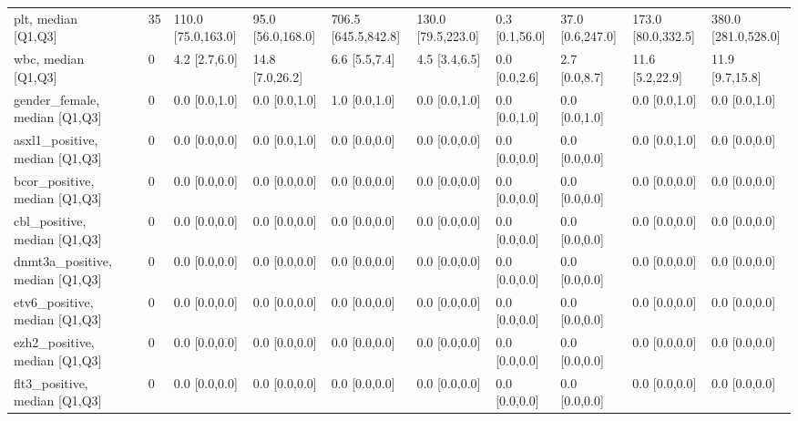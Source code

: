 \begin{tabular}{lllllllllll}
plt, median [Q1,Q3] &    &                   35 &  110.0 [75.0,163.0] &  95.0 [56.0,168.0] &  706.5 [645.5,842.8] &  130.0 [79.5,223.0] &    0.3 [0.1,56.0] &  37.0 [0.6,247.0] &  173.0 [80.0,332.5] &  380.0 [281.0,528.0] \\
wbc, median [Q1,Q3] &    &                    0 &       4.2 [2.7,6.0] &    14.8 [7.0,26.2] &        6.6 [5.5,7.4] &       4.5 [3.4,6.5] &     0.0 [0.0,2.6] &     2.7 [0.0,8.7] &     11.6 [5.2,22.9] &      11.9 [9.7,15.8] \\
gender\_female, median [Q1,Q3] &    &                    0 &       0.0 [0.0,1.0] &      0.0 [0.0,1.0] &        1.0 [0.0,1.0] &       0.0 [0.0,1.0] &     0.0 [0.0,1.0] &     0.0 [0.0,1.0] &       0.0 [0.0,1.0] &        0.0 [0.0,1.0] \\
asxl1\_positive, median [Q1,Q3] &    &                    0 &       0.0 [0.0,0.0] &      0.0 [0.0,1.0] &        0.0 [0.0,0.0] &       0.0 [0.0,0.0] &     0.0 [0.0,0.0] &     0.0 [0.0,0.0] &       0.0 [0.0,1.0] &        0.0 [0.0,0.0] \\
bcor\_positive, median [Q1,Q3] &    &                    0 &       0.0 [0.0,0.0] &      0.0 [0.0,0.0] &        0.0 [0.0,0.0] &       0.0 [0.0,0.0] &     0.0 [0.0,0.0] &     0.0 [0.0,0.0] &       0.0 [0.0,0.0] &        0.0 [0.0,0.0] \\
cbl\_positive, median [Q1,Q3] &    &                    0 &       0.0 [0.0,0.0] &      0.0 [0.0,0.0] &        0.0 [0.0,0.0] &       0.0 [0.0,0.0] &     0.0 [0.0,0.0] &     0.0 [0.0,0.0] &       0.0 [0.0,0.0] &        0.0 [0.0,0.0] \\
dnmt3a\_positive, median [Q1,Q3] &    &                    0 &       0.0 [0.0,0.0] &      0.0 [0.0,0.0] &        0.0 [0.0,0.0] &       0.0 [0.0,0.0] &     0.0 [0.0,0.0] &     0.0 [0.0,0.0] &       0.0 [0.0,0.0] &        0.0 [0.0,0.0] \\
etv6\_positive, median [Q1,Q3] &    &                    0 &       0.0 [0.0,0.0] &      0.0 [0.0,0.0] &        0.0 [0.0,0.0] &       0.0 [0.0,0.0] &     0.0 [0.0,0.0] &     0.0 [0.0,0.0] &       0.0 [0.0,0.0] &        0.0 [0.0,0.0] \\
ezh2\_positive, median [Q1,Q3] &    &                    0 &       0.0 [0.0,0.0] &      0.0 [0.0,0.0] &        0.0 [0.0,0.0] &       0.0 [0.0,0.0] &     0.0 [0.0,0.0] &     0.0 [0.0,0.0] &       0.0 [0.0,0.0] &        0.0 [0.0,0.0] \\
flt3\_positive, median [Q1,Q3] &    &                    0 &       0.0 [0.0,0.0] &      0.0 [0.0,0.0] &        0.0 [0.0,0.0] &       0.0 [0.0,0.0] &     0.0 [0.0,0.0] &     0.0 [0.0,0.0] &       0.0 [0.0,0.0] &        0.0 [0.0,0.0] \\

\end{tabular}
